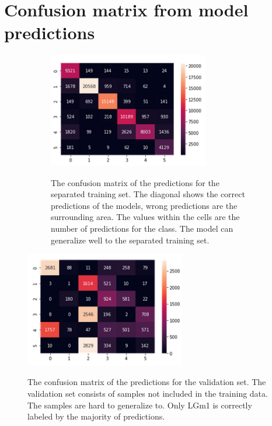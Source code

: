 \documentclass[a4paper, 12pt, oneside]{book}
\begin{document}
\begin{appendices}
\begin{figure}[H]
\end{figure}

\chapter{Confusion matrix from model predictions}
\label{appendix:confm_half}

\begin{figure}[H]

\begin{figure}[H]

    \centering
{\includegraphics[width=7cm]{images/DL/confm_trainhalf.png} }
\caption{The confusion matrix of the predictions for the separated training set. The diagonal shows the correct predictions of the models, wrong predictions are the surrounding area. The values within the cells are the number of predictions for the class. The model can generalize well to the separated training set.}

\end{figure}

    \centering
{\includegraphics[width=7cm]{images/DL/confm_valhalf.png} }
\caption{The confusion matrix of the predictions for the validation set. The validation set consists of samples not included in the training data. The samples are hard to generalize to. Only LGm1 is correctly labeled by the majority of predictions.}

\end{figure}

\end{appendices}
\end{document}
